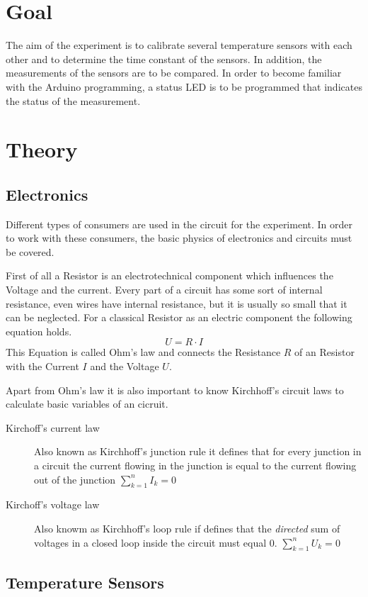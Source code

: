 \section*{Goal}
The aim of the experiment is to calibrate several temperature sensors with each other and to determine the time constant of the sensors.
In addition, the measurements of the sensors are to be compared.
In order to become familiar with the Arduino programming, a status LED is to be programmed that indicates the status of the measurement.
\section{Theory}
\label{sec:theory}

\subsection{Electronics}
Different types of consumers are used in the circuit for the experiment.
In order to work with these consumers, the basic physics of electronics and circuits must be covered.

First of all a Resistor is an electrotechnical component which influences the Voltage and the current.
Every part of a circuit has some sort of internal resistance, even wires have internal resistance, but it is usually so small that it can be neglected.
For a classical Resistor as an electric component the following equation holds.
\begin{equation}
    \label{ohm}
    U = R \cdot I
\end{equation}
This Equation is called Ohm's law and connects the Resistance $R$ of an Resistor with the Current $I$ and the Voltage $U$.

Apart from Ohm's law it is also important to know Kirchhoff's circuit laws to calculate basic variables of an cicruit.
\begin{description}
    \item[Kirchoff's current law] Also known as Kirchhoff's junction rule it defines that for every junction in a circuit the current flowing in the junction is equal to the current flowing out of the junction $\sum_{k = 1}^n I_k = 0$
    \item[Kirchoff's voltage law] Also knowm as Kirchhoff's loop rule if defines that the \textit{directed} sum of voltages in a closed loop inside the circuit must equal 0. $\sum_{k = 1}^n U_k = 0$ 
\end{description} 

\subsection{Temperature Sensors}
